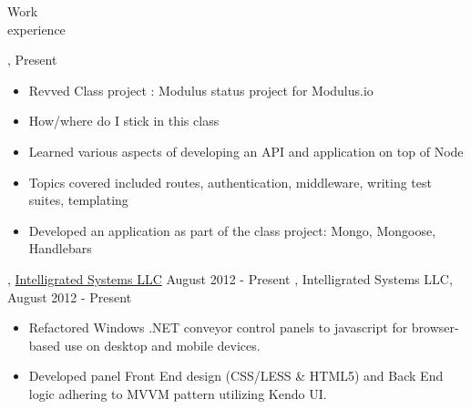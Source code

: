 \begin{category}{Work \\experience}

\ifRevvedProject
{}, Present
\begin{itemize}
\item Revved Class project : Modulus status project for Modulus.io 
\item How/where do I stick in this class
\item Learned various aspects of developing an API and application on top of Node
\item Topics covered included routes, authentication, middleware, writing test suites, templating
\item Developed an application as part of the class project: Mongo, Mongoose, Handlebars
\end{itemize}
\fi

\ifWebLinks
{}, \href{http://www.intelligrated.com}{Intelligrated Systems LLC} August 2012 - Present
\else
{}, Intelligrated Systems LLC, August 2012 - Present
\fi 

\begin{itemize}
\item Refactored Windows .NET conveyor control panels to javascript for browser-based use on desktop and mobile devices.
\item Developed panel Front End design (CSS/LESS \& HTML5) and Back End logic adhering to MVVM pattern utilizing Kendo UI. %


\end{itemize}
\end{category}
